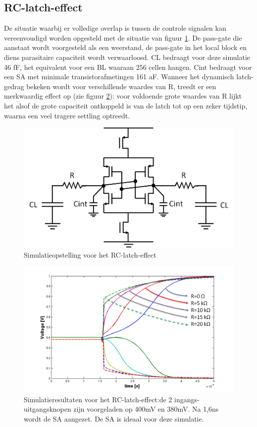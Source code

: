 \subsection{RC-latch-effect}
\label{RC-latch-effect}
De situatie waarbij er volledige overlap is tussen de controle signalen kan vereenvoudigd worden opgesteld met de situatie van figuur \ref{fig:RC-latch}. De pass-gate die aanstaat wordt voorgesteld als een weerstand, de pass-gate in het local block en diens parasitaire capaciteit wordt verwaarloosd. CL bedraagt voor deze simulatie 46 fF, het equivalent voor een BL waaraan 256 cellen hangen. Cint bedraagt voor een SA met minimale transistorafmetingen 161 aF. Wanneer het dynamisch latch-gedrag bekeken wordt voor verschillende waardes van R, treedt er een merkwaardig effect op (zie figuur \ref{fig:RC-latch-sim}): voor voldoende grote waardes van R lijkt het alsof de grote capaciteit ontkoppeld is van de latch tot op een zeker tijdstip, waarna een veel tragere settling optreedt.
\begin{figure}
  \centering
  \includegraphics[scale=0.4]{../fig/hfdstk-sensamp-RC-latch.png}
  \caption{Simulatieopstelling voor het RC-latch-effect}
  \label{fig:RC-latch}
\end{figure}
\begin{figure}
  \centering
  \includegraphics[scale=0.4]{../fig/hfdstk-sensamp-RC-latch-sim.png}
  \caption{Simulatieresultaten voor het RC-latch-effect:de 2 ingangs-uitgangsknopen zijn voorgeladen op 400mV en 380mV. Na 1,6ns wordt de SA aangezet. De SA is ideaal voor deze simulatie.}
  \label{fig:RC-latch-sim}
\end{figure}
